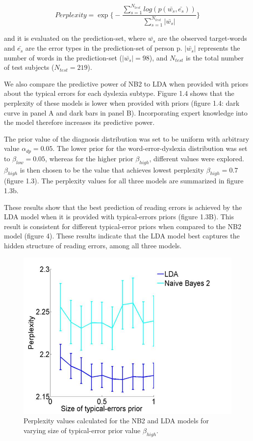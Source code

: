 {{\begin{equation}
Perplexity = \exp{\Bigg\{-\frac{\sum_{s=1}^{N_{test}} log(p(\bar{w_s}, \bar{e_s}))}{\sum_{s=1}^{N_{test}}|\bar{w_s}|}\Bigg\}}
\end{equation}

and it is evaluated on the prediction-set, where $ \bar{w_s} $ are the observed target-words and $ \bar{e_s} $ are the error types in the prediction-set of person p. $|\bar{w_s}|$ represents the number of words in the prediction-set ($|\bar{w_s}| = 98$), and $ N_{test} $ is the total number of test subjects ($ N_{test} = 219 $).

We also compare the predictive power of NB2 to LDA when provided with priors about the typical errors for each dyslexia subtype. Figure 1.4 shows that the perplexity of these models is lower when provided with priors (figure 1.4: dark curve in panel A and dark bars in panel B). Incorporating expert knowledge into the model therefore increases its predictive power.

The prior value of the diagnosis distribution was set to be uniform with arbitrary value $ \alpha_{dp} = 0.05 $. The lower prior for the word-error-dyslexia distribution was set to $ \beta_{low} = 0.05 $, whereas for the higher prior $ \beta_{high} $, different values were explored. $ \beta_{high} $ is then chosen to be the value that achieves lowest perplexity $ \beta_{high} = 0.7 $ (figure 1.3). The perplexity values for all three models are summarized in figure 1.3b.

These results show that the best prediction of reading errors is achieved by the LDA model when it is provided with typical-errors priors (figure 1.3B). This result is consistent for different typical-error priors when compared to the NB2 model (figure 4). These results indicate that the LDA model best captures the hidden structure of reading errors, among all three models.

\begin{figure}[h]
\vspace{.3in}
\includegraphics[width=\linewidth]{Figures/Ch1/figure5C.jpg}
\vspace{.3in}
\caption{Perplexity values calculated for the NB2 and LDA models for varying size of typical-error prior value $\beta_{high}$.}
\end{figure}

}}
